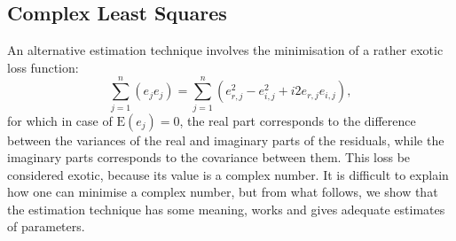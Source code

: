 \documentclass[
]{book}
\begin{document}
\hypertarget{complex-least-squares}{%
\subsection{Complex Least Squares}\label{complex-least-squares}}

An alternative estimation technique involves the minimisation of a rather exotic loss function:
\begin{equation}
    \sum_{j=1}^n (e_j e_j) = \sum_{j=1}^n (e_{r,j}^2 - e_{i,j}^2 + i 2 e_{r,j} e_{i,j}),
    \label{eq:SimpleCLRCLSLoss}
\end{equation}
for which in case of \(\mathrm{E}(e_j)=0\), the real part corresponds to the difference between the variances of the real and imaginary parts of the residuals, while the imaginary parts corresponds to the covariance between them. This loss be considered exotic, because its value is a complex number. It is difficult to explain how one can minimise a complex number, but from what follows, we show that the estimation technique has some meaning, works and gives adequate estimates of parameters.
\end{document}

